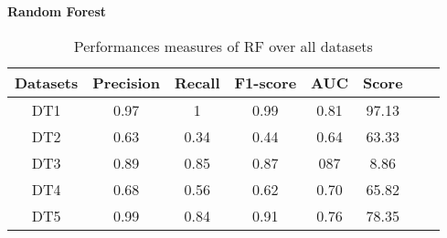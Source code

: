 \documentclass[10pt,a4paper]{article}
\begin{document}
\begin{center}
\textbf{Random Forest}
\end{center}
\begin{table}[!ht]
\centering
\begin{tabular}{*{6}{c}l r}
  \toprule
  \textbf{Datasets} & \textbf{Precision} & \textbf{Recall} & \textbf{F1-score}&\textbf{AUC} &\textbf{Score}\\
   \midrule
  DT1 &0.97 &1   &0.99 &0.81 &97.13 \\
  DT2 &0.63  & 0.34  &0.44&0.64&63.33 \\
  DT3 &0.89 &0.85 &0.87&087&8.86\\
  DT4 &0.68 &0.56&0.62&0.70&65.82\\
  DT5 &0.99 &0.84&0.91&0.76&78.35\\
  
  
    \bottomrule
\end{tabular}
\caption{Performances measures of RF over all datasets}\label{perf-measure-dt1}
\end{table}
\end{document}
